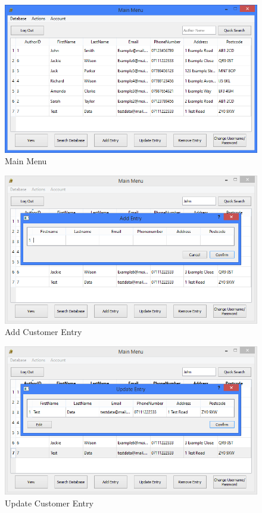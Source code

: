 \begin{figure}[H]
    \caption{Main Menu} \label{fig:MainMenu}
    \includegraphics[width=\textwidth]{./Maintenance/UserInterface/MainMenu.png}
\end{figure}

\begin{figure}[H]
    \caption{Add Customer Entry} \label{fig:AddEntry}
    \includegraphics[width=\textwidth]{./Maintenance/UserInterface/AddEntry.png}
\end{figure}

\begin{figure}[H]
    \caption{Update Customer Entry} \label{fig:UpdateEntry}
    \includegraphics[width=\textwidth]{./Maintenance/UserInterface/UpdateEntry.png}
\end{figure}

